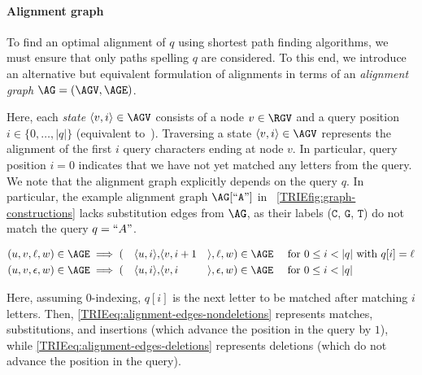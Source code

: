 \paragraph{Alignment graph}
To find an optimal alignment of $q$ using shortest path finding algorithms, we
must ensure that only paths spelling $q$ are considered. To this end, we
introduce an alternative but equivalent formulation of alignments in terms of an
\emph{alignment graph} $\AG=(\AGV,\AGE)$.

Here, each \emph{state} $\langle v,i \rangle \in \AGV$ consists of a node $v \in
\RGV$ and a query position $i \in \{0,\dots,|q|\}$ (equivalent
to~\cite{rautiainen_aligning_2017}). Traversing a state $\langle v,i \rangle \in
\AGV$ represents the alignment of the first $i$ query characters ending at node $v$.
%
In particular, query position $i=0$ indicates that we have not yet matched any
letters from the query.
%
We note that the alignment graph explicitly depends on the query $q$. In
particular, the example alignment graph $\AG[``\texttt{A}"]$ in
~\cref{TRIEfig:graph-constructions} lacks substitution edges from $\AG$, as their
labels ($\texttt{C}$, $\texttt{G}$, $\texttt{T}$) do not match the query
$q=``A"$.



\vspace{-1.2em}
{%
\small
\begin{alignat}{10}
	(u,v,\ell,w) &\in \AGE \implies (&\langle u, i \rangle, &\langle v, i+1
		&&\rangle,\ell,w) \in \AGE \quad \text{ for } 0 \leq i < |q| \text{ with }
		q[i]=\ell \label{TRIEeq:alignment-edges-nondeletions} \\
	(u,v,\epsilon,w) &\in\AGE \implies (&\langle u, i \rangle, &\langle v, i
		&&\rangle,\epsilon,w) \in \AGE \quad \text{ for } 0 \leq i < |q| \label{TRIEeq:alignment-edges-deletions}
\end{alignat}
}%

Here, assuming $0$-indexing, $q[i]$ is the next letter to be matched after
matching $i$ letters. Then, \cref{TRIEeq:alignment-edges-nondeletions} represents
matches, substitutions, and insertions (which advance the position in the query
by $1$), while \cref{TRIEeq:alignment-edges-deletions} represents deletions (which do
not advance the position in the query).